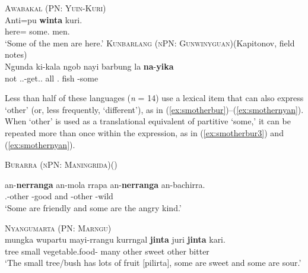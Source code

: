 \documentclass[12pt,egregdoesnotlikesansseriftitles]{scrartcl}
\begin{document}
\begin{exe}
  \ex\label{ex:specsmawa} \textsc{Awabakal (PN: Yuin-Kuri)}\hfill {}\\
  \gll Anti=pu \textbf{winta} kuri.\\
  here=\Excl{} some.\Abs{} men.\Abs\\
  \glt `Some of the men are here.' %
  \ex\label{ex:specsmwlg} \textsc{Kunbarlang (nPN: Gunwinyguan)}\hfill (Kapitonov, field notes)\\
  {\gll Ngunda ki-kala ngob nayi barbung la \textbf{na}-\textbf{yika}\\
  not \Tsg.\Irr.\Pst-get.\Irr.\Pst{} all \Nm.\Cli{} fish \Conj{} \Cli-some\\}
\end{exe}

Less than half of these languages (\textit{n} = 14) use a lexical item that can also express `other' (or, less frequently, `different'),  as in (\ref{ex:smotherbur})--(\ref{ex:smothernyan}). When `other' is used as a translational equivalent of partitive `some,' it can be repeated more than once within the expression, as in (\ref{ex:smotherbur3}) and (\ref{ex:smothernyan}).
\begin{exe}
  \ex\label{ex:smotherbur} \textsc{Burarra (nPN: Maningrida)}\hfill (\citealt{green87})
  \begin{xlist}
    \ex \gll an-\textbf{nerranga} an-mola  rrapa  an-\textbf{nerranga}  an-bachirra.\\
    \Third.\Min-other \Third\Min-good and \Third\Min-other \Third\Min-wild\\
    \glt `Some are friendly and some are the angry kind.' \label{ex:smotherbur3}
  \end{xlist}
  \ex\label{ex:smothernyan} \textsc{Nyangumarta (PN: Marngu)}\hfill {}\\
  \gll mungka wupartu mayi-rrangu kurrngal \textbf{jinta} juri \textbf{jinta} kari.\\
  tree  small vegetable.food-\Pl{} many other sweet other bitter\\
  \glt `The small tree/bush has lots of fruit [pilirta], some are sweet and some are sour.'
\end{exe}
\end{document}

